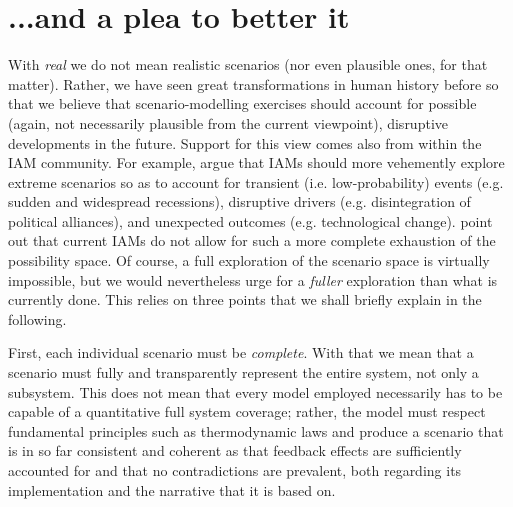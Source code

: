 \documentclass{article}
\begin{document}
\begin{refsection}
\label{discussion}
\section{...and a plea to better it}

With \textit{real} we do not mean realistic scenarios (nor even plausible ones, for that matter). Rather, we have seen great transformations in human history before \parencite{fischer_2014} so that we believe that scenario-modelling exercises should account for possible (again, not necessarily plausible from the current viewpoint), disruptive developments in the future.\footnotemark{} Support for this view comes also from within the IAM community. For example, \textcite{mccollum_2020} argue that IAMs should more vehemently explore extreme scenarios so as to account for transient (i.e. low-probability) events (e.g. sudden and widespread recessions), disruptive drivers (e.g. disintegration of political alliances), and unexpected outcomes (e.g. technological change). \textcite{gambhir_2022} point out that current IAMs do not allow for such a more complete exhaustion of the possibility space. Of course, a full exploration of the scenario space is virtually impossible, but we would nevertheless urge for a \textit{fuller} exploration than what is currently done. This relies on three points that we shall briefly explain in the following.


First, each individual scenario must be \textit{complete}. With that we mean that a scenario must fully and transparently represent the entire system, not only a subsystem. This does not mean that every model employed necessarily has to be capable of a quantitative full system coverage; rather, the model must respect fundamental principles such as thermodynamic laws and produce a scenario that is in so far consistent and coherent as that feedback effects are sufficiently accounted for and that no contradictions are prevalent, both regarding its implementation and the narrative that it is based on.


\end{refsection}
\end{document}
